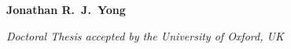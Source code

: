 \hspace{0pt}
\vfill
\begin{center}
    \Huge
    \textbf{\thesistitle}

    \vspace{1.5cm}

    \LARGE
    \textbf{Jonathan R.\ J.\ Yong}

    \vspace{1.2cm}

    \Large
    \textit{Doctoral Thesis accepted by the University of Oxford, UK}

\end{center}
\thispagestyle{empty}
\vfill
\hspace{0pt}
\newpage

